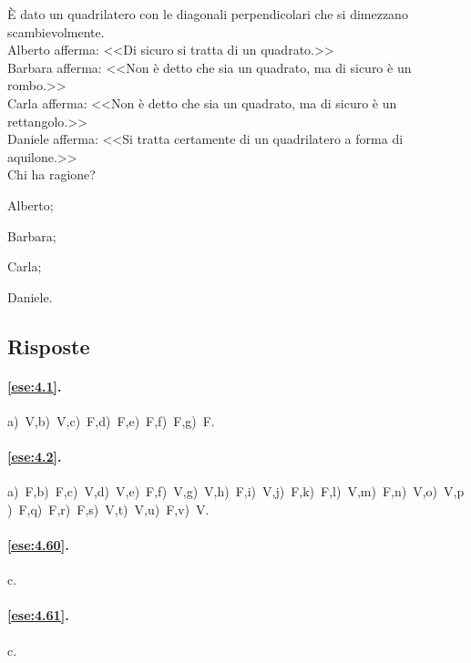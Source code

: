 \begin{esercizio}
\label{ese:4.67}
\`E dato un quadrilatero con le diagonali perpendicolari che si dimezzano scambievolmente.\\
Alberto afferma: <<Di sicuro si tratta di un quadrato.>>\\
Barbara afferma: <<Non è detto che sia un quadrato, ma di sicuro è un rombo.>>\\
Carla afferma: <<Non è detto che sia un quadrato, ma di sicuro è un rettangolo.>>\\
Daniele afferma: <<Si tratta certamente di un quadrilatero a forma di aquilone.>>\\
Chi ha ragione?
\begin{multicols}{4}
\begin{enumeratea}
\item Alberto;
\item Barbara;
\item Carla;
\item Daniele.
\end{enumeratea}
\end{multicols}
\end{esercizio}


\subsection{Risposte}

\begingroup
\hypersetup{linkcolor=black}

\paragraph{\ref{ese:4.1}.}
a)~V,\quad b)~V,\quad c)~F,\quad d)~F,\quad e)~F,\quad f)~F,\quad g)~F.

\paragraph{\ref{ese:4.2}.}
a)~F,\quad b)~F,\quad c)~V,\quad d)~V,\quad e)~F,\quad f)~V,\quad g)~V,\quad h)~F,\quad i)~V,\quad j)~F,\quad k)~F,\quad l)~V,\quad m)~F,\quad n)~V,\quad o)~V,\quad p)~F,\quad q)~F,\quad r)~F,\quad s)~V,\quad t)~V,\quad u)~F,\quad v)~V.

\paragraph{\ref{ese:4.60}.}
c.

\paragraph{\ref{ese:4.61}.}
c.

